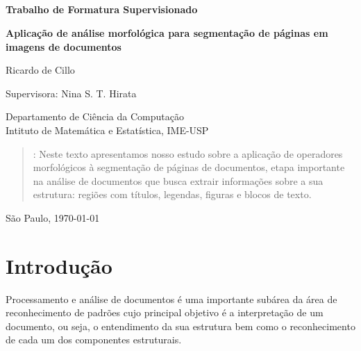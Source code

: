 \documentclass[a4paper,11pt]{article}
\begin{document}


\thispagestyle{empty}
\

\

\

\

\begin{center}
{\bf \Large Trabalho de Formatura Supervisionado}

\bigskip
\bigskip
{\bf \LARGE Aplicação de análise morfológica para segmentação de páginas em imagens de documentos}

\bigskip
{\large Ricardo de Cillo}

\bigskip
Supervisora: Nina S. T. Hirata 

\bigskip
Departamento de Ciência da Computação\\
Intituto de Matemática e Estatística, IME-USP
\end{center}


\bigskip
\begin{quote}
\begin{spacing}{1.2}
: Neste texto apresentamos nosso estudo sobre a aplicação de operadores morfológicos à segmentação de páginas de documentos, etapa importante na análise de documentos que busca extrair informações sobre a sua estrutura: regiões com títulos, legendas, figuras e blocos de texto.
\end{spacing} 
\end{quote}

\bigskip
\begin{center}
São Paulo, \today
\end{center}


\newpage

\tableofcontents

\newpage
\setcounter{page}{1}

\section{Introdução}

Processamento e análise de documentos é uma importante subárea da área
de reconhecimento de padrões cujo principal objetivo é a
interpretação de um documento, ou seja, o entendimento
da sua estrutura bem como o reconhecimento de cada um dos
componentes estruturais.
\end{document}
